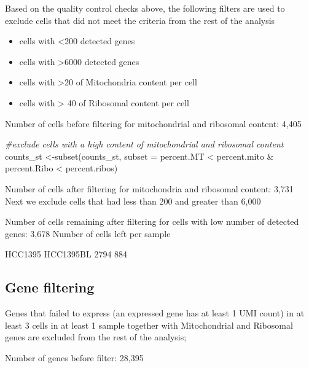 \documentclass[
]{book}
\newenvironment{Shaded}{\begin{snugshade}}{\end{snugshade}}
\newcommand{\AttributeTok}[1]{\textcolor[rgb]{0.77,0.63,0.00}{#1}}
\newcommand{\CommentTok}[1]{\textcolor[rgb]{0.56,0.35,0.01}{\textit{#1}}}
\newcommand{\FunctionTok}[1]{\textcolor[rgb]{0.00,0.00,0.00}{#1}}
\newcommand{\NormalTok}[1]{#1}
\newcommand{\OtherTok}[1]{\textcolor[rgb]{0.56,0.35,0.01}{#1}}
\newcommand{\SpecialCharTok}[1]{\textcolor[rgb]{0.00,0.00,0.00}{#1}}
\begin{document}
Based on the quality control checks above, the following filters are used to exclude cells that did not meet the criteria from the rest of the analysis

\begin{itemize}
\item cells with <200 detected genes
\item cells with >6000 detected genes
\item cells with >20 of Mitochondria content per cell
\item cells with > 40 of Ribosomal content per cell
\end{itemize}

Number of cells before filtering for mitochondrial and ribosomal content: 4,405

\begin{Shaded}
\begin{Highlighting}[]
\CommentTok{\#exclude cells with a high content of mitochondrial and ribosomal content}
\NormalTok{counts\_st }\OtherTok{\textless{}{-}}\FunctionTok{subset}\NormalTok{(counts\_st, }\AttributeTok{subset =}\NormalTok{ percent.MT }\SpecialCharTok{\textless{}}\NormalTok{ percent.mito }\SpecialCharTok{\&}
\NormalTok{           percent.Ribo }\SpecialCharTok{\textless{}}\NormalTok{ percent.ribos)}
\end{Highlighting}
\end{Shaded}

Number of cells after filtering for mitochondria and ribosomal content: 3,731
Next we exclude cells that had less than 200 and greater than 6,000

Number of cells remaining after filtering for cells with
low number of detected genes: 3,678
Number of cells left per sample

HCC1395 HCC1395BL
2794 884

\hypertarget{gene-filtering}{%
\subsection{Gene filtering}\label{gene-filtering}}

Genes that failed to express (an expressed gene has at least 1 UMI count) in at least 3 cells in at least 1 sample together with Mitochondrial and Ribosomal genes are excluded from the rest of the analysis;

Number of genes before filter: 28,395
\end{document}
